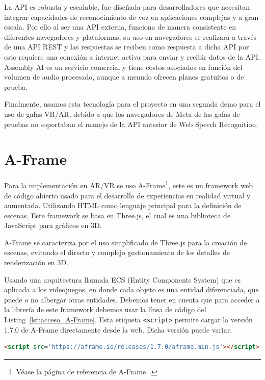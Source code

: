 \documentclass[a4paper, 12pt]{book}
\let\cleardoublepage\clearpage
\begin{document}
La API es robusta y escalable, fue diseñada para desarrolladores que necesitan integrar capacidades de reconocimiento de voz en aplicaciones complejas y a gran escala. Por ello al ser una API externa, funciona de manera consistente en diferentes navegadores y plataformas, su uso en navegadores se realizará a través de una API REST y las respuestas se reciben como respuesta a dicha API por esto requiere una conexión a internet activa para enviar y recibir datos de la API. Assembly AI es un servicio comercial y tiene costos asociados en función del volumen de audio procesado, aunque a menudo ofrecen planes gratuitos o de prueba.

Finalmente, usamos esta tecnología para el proyecto en una segunda demo para el uso de gafas VR/AR, debido a que los navegadores de Meta de las gafas de pruebas no soportaban el manejo de la API anterior de Web Speech Recognition.

\cleardoublepage
\section{A-Frame} 
\label{sec:seccion2}

Para la implementación en AR/VR se uso A-Frame\footnote{Véase la página de referencia de A-Frame~\cite{aframe2025}.}, este es un framework web de código abierto usado para el desarrollo de experiencias en realidad virtual y aumentada. Utilizando HTML como lenguaje principal para la definición de escenas. Este framework se basa en Three.js, el cual es una biblioteca de JavaScript para gráficos en 3D.

A-Frame se caracteriza por el uso simplificado de Three.js para la creación de escenas, evitando el directo y complejo gestionamiento de los detalles de renderización en 3D.

Usando una arquitectura llamada ECS (Entity Components System) que es aplicada a los videojuegos, en donde cada objeto es una entidad diferenciada, que puede o no albergar otras entidades. Debemos tener en cuenta que para acceder a la librería de este framework debemos usar la línea de código del Listing~\ref{lst:acceso_A-Frame}. Esta etiqueta \texttt{<script>} permite cargar la versión 1.7.0 de A-Frame directamente desde la web. Dicha versión puede variar.
\begin{lstlisting}[language=HTML, caption=Línea de código de A-Frame, captionpos=b,label=lst:acceso_A-Frame]
  <script src='https://aframe.io/releases/1.7.0/aframe.min.js'></script>
\end{lstlisting}
\end{document}
